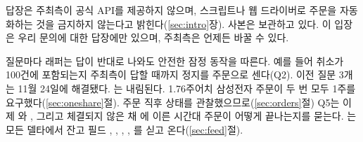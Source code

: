 답장은 주최측이 공식 API를 제공하지 않으며, 스크립트나 웹 드라이버로 주문을 자동화하는 것을 금지하지 않는다고 밝힌다(\ref{sec:intro}장). 사본은 보관하고 있다. 이 입장은 우리 문의에 대한 답장에만 있으며, 주최측은 언제든 바꿀 수 있다.

 질문마다 래퍼는 답이 반대로 나와도 안전한 잠정 동작을 따른다. 예를 들어 취소가 100건에 포함되는지 주최측이 답할 때까지 정지를 주문으로 센다(Q2). 이전 질문 3개는 11월 24일에 해결됐다. 는 내림된다. 1.76주어치 삼성전자 주문이 두 번 모두 1주를 요구했다(\ref{sec:oneshare}절). 주문 직후  상태를 관찰했으므로(\ref{sec:orders}절) Q5는 이제 와 , 그리고 체결되지 않은 채 에 이른 시간대 주문이 어떻게 끝나는지를 묻는다. 는 모든 델타에서 잔고 필드 , , , , 를 싣고 온다(\ref{sec:feed}절).



